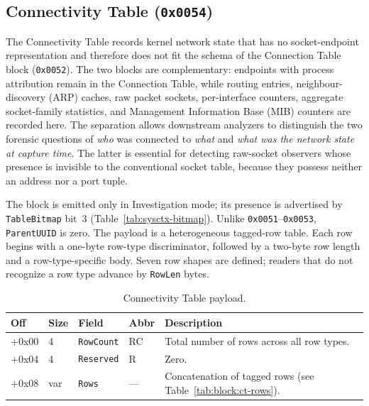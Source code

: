 \documentclass[11pt,a4paper]{article}
\newcommand{\hex}[1]{\texttt{0x#1}}
\newcommand{\field}[1]{\texttt{#1}}
\begin{document}
\subsection{Connectivity Table (\hex{0054})}
\label{sec:block:connectivity-table}

The Connectivity Table records kernel network state that has no
socket-endpoint representation and therefore does not fit the schema of the Connection Table block (\texttt{0x0052}). The two blocks are complementary: endpoints with process attribution remain in the Connection Table, while routing entries, neighbour-discovery (ARP) caches, raw packet sockets, per-interface counters, aggregate socket-family statistics, and Management Information Base (MIB) counters are recorded here. The separation allows downstream analyzers to distinguish the two forensic questions of \emph{who} was connected to \emph{what} and \emph{what was the network state at capture time}. The
latter is essential for detecting raw-socket observers whose presence is invisible to the conventional socket table, because they possess neither an address nor a port tuple.

The block is emitted only in Investigation mode; its presence is advertised by \field{TableBitmap} bit~3 (Table~\ref{tab:sysctx-bitmap}). Unlike \hex{0051}--\hex{0053}, \field{ParentUUID} is zero. The payload is a heterogeneous tagged-row table. Each row begins with a one-byte row-type discriminator, followed by a two-byte row length and a row-type-specific body. Seven row shapes are defined; readers that do not recognize a row type advance by \texttt{RowLen} bytes.

\begin{table}[H]\centering\caption{Connectivity Table payload.}\label{tab:block:ct}\small
\begin{tabular}{M M l l p{5.5cm}}\toprule\textbf{Off}&\textbf{Size}&\textbf{Field}&\textbf{Abbr}&\textbf{Description}\\\midrule
+0x00 & 4   & \field{RowCount} & RC  & Total number of rows across all row types. \\
+0x04 & 4   & \field{Reserved} & R   & Zero. \\
+0x08 & var & \field{Rows}     & --- & Concatenation of tagged rows (see Table~\ref{tab:block:ct-rows}). \\\bottomrule
\end{tabular}\end{table}
\end{document}
